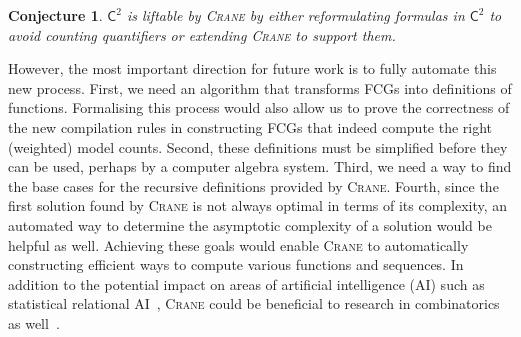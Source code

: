 \documentclass{article}
\newtheorem{conjecture}{Conjecture}
\theoremstyle{definition}
\theoremstyle{remark}
\newcommand{\Ctwo}{$\mathsf{C}^{2}$}
\begin{document}
\begin{conjecture}
  \Ctwo{} is liftable by \textsc{Crane} by either reformulating formulas in
  \Ctwo{} to avoid counting quantifiers or extending \textsc{Crane} to support
  them.
\end{conjecture}

However, the most important direction for future work is to fully automate this
new process. First, we need an algorithm that transforms FCGs into definitions
of functions. Formalising this process would also allow us to prove the
correctness of the new compilation rules in constructing FCGs that indeed
compute the right (weighted) model counts. Second, these definitions must be
simplified before they can be used, perhaps by a computer algebra system. Third,
we need a way to find the base cases for the recursive definitions provided by
\textsc{Crane}. Fourth, since the first solution found by \textsc{Crane} is not
always optimal in terms of its complexity, an automated way to determine the
asymptotic complexity of a solution would be helpful as well. Achieving these
goals would enable \textsc{Crane} to automatically constructing efficient ways
to compute various functions and sequences. In addition to the potential impact
on areas of artificial intelligence (AI) such as statistical relational
AI~\cite{DBLP:series/synthesis/2016Raedt}, \textsc{Crane} could be beneficial to
research in combinatorics as
well~\cite{DBLP:conf/ilp/BarvinekB0ZK21,DBLP:journals/corr/abs-2302-04606}.



\end{document}
